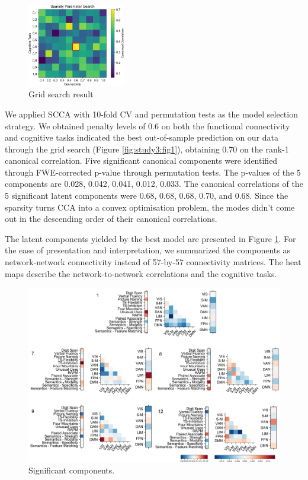 \begin{figure}
    \vspace{-10pt}
    \centering
    \includegraphics[width=0.38\textwidth]{study3/image/study3fig2.png}
    \caption{Grid search result}
    \label{fig:study3:fig2}
    \vspace{-20pt}
\end{figure}

We applied SCCA with 10-fold CV and permutation tests as the model selection strategy. We obtained penalty levels of 0.6 on both the functional connectivity and cognitive tasks indicated the best out-of-sample prediction on our data through the grid search (Figure \ref{fig:study3:fig1}), obtaining 0.70 on the rank-1 canonical correlation. Five significant canonical components were identified through FWE-corrected p-value through permutation tests. The p-values of the 5 components are 0.028, 0.042, 0.041, 0.012, 0.033. The canonical correlations of the 5 significant latent components were 0.68, 0.68, 0.68, 0.70, and 0.68. Since the sparsity turns CCA into a convex optimisation problem, the modes didn't come out in the descending order of their canonical correlations.

The latent components yielded by the best model are presented in Figure \ref{fig:study3:fig2}. For the ease of presentation and interpretation, we summarized the components as network-network connectivity instead of 57-by-57 connectivity matrices. The heat maps describe the network-to-network correlations and the cognitive tasks.

\begin{figure}[H]
    \centering
    \includegraphics[width=1\textwidth]{study3/image/study3fig3.png}
    \caption{Significant components.}
    \label{fig:study3:fig3}
\end{figure}

